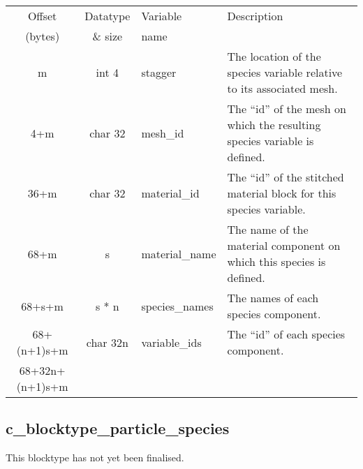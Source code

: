 \documentclass[12pt]{article}
\newcommand{\subsubsec}{\subsection}
\begin{document}
\begin{center}
\begin{tabularx}{0.9\textwidth}[!hbt]{cclX}
  Offset & Datatype & Variable & Description\\
  (bytes) & \& size & name &
  \\\toprule

  m & int 4 & stagger & The location of the species variable relative to its
  associated mesh.
  \\\midrule

  4+m & char 32 & mesh\_id & The ``id'' of the mesh on which the resulting
  species variable is defined.
  \\\midrule

  36+m & char 32 & material\_id & The ``id'' of the stitched material block
  for this species variable.
  \\\midrule

  68+m & s & material\_name & The name of the material component on which
  this species is defined.
  \\\midrule

  68+s+m & s * n & species\_names & The names of each species component.
  \\\midrule

  68+(n+1)s+m & char 32n & variable\_ids & The ``id'' of each species component.
  \\\midrule

  68+32n+(n+1)s+m &
\end{tabularx}
\end{center}\vspace{10pt}


\subsubsec{c\_blocktype\_particle\_species}

This blocktype has not yet been finalised.
\end{document}
